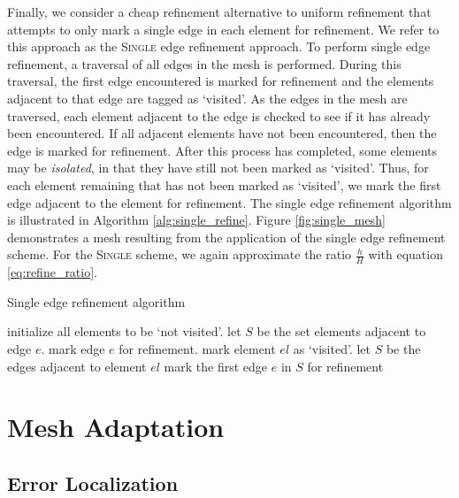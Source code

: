 Finally, we consider a cheap refinement alternative to
uniform refinement that attempts to only mark a single edge
in each element for refinement. We refer to this approach
as the \textsc{Single} edge refinement approach.
To perform single edge refinement, a traversal of all
edges in the mesh is performed. During this traversal,
the first edge encountered is marked for refinement
and the elements adjacent to that edge are tagged
as `visited'. As the edges in the mesh are traversed,
each element adjacent to the edge is checked to see
if it has already been encountered. If all adjacent
elements have not been encountered, then the edge
is marked for refinement.
After this process has completed, some elements may be
\emph{isolated}, in that they have still not been marked as `visited'.
Thus, for each element remaining that has not been marked as `visited',
we mark the first edge adjacent to the element for refinement.
The single edge refinement
algorithm is illustrated in Algorithm \ref{alg:single_refine}.
Figure \ref{fig:single_mesh} demonstrates a mesh
resulting from the application of the single
edge refinement scheme. For the \textsc{Single}
scheme, we again approximate the ratio
$\frac{h}{H}$ with equation \eqref{eq:refine_ratio}.

\begin{algorithm}
\caption{Single edge refinement algorithm}
\begin{algorithmic}
\State initialize all elements to be `not visited'.
\State let $S$ be the set elements adjacent to edge $e$.
\State mark edge $e$ for refinement.
\State mark element $el$ as `visited'.
\EndFor
\EndIf
\EndFor
{}
\State let $S$ be the edges adjacent to element $el$
\State mark the first edge $e$ in $S$ for refinement
\EndIf
\EndFor
\end{algorithmic}
\label{alg:single_refine}
\end{algorithm}

\section{Mesh Adaptation}

\subsection{Error Localization}

